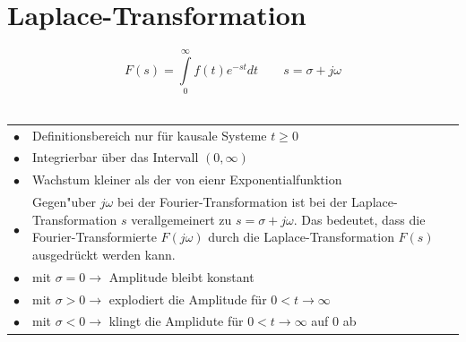 \section{Laplace-Transformation}
	$$\boxed{F(s)=\int\limits_0^\infty f(t)e^{-st}dt} \qquad s=\sigma+j\omega$$\\
	\begin{tabular}{p{1cm}p{17cm}}
		$\bullet$ & Definitionsbereich nur für kausale Systeme $t\geq 0$\\
		$\bullet$ & Integrierbar über das Intervall $(0,\infty)$\\
		$\bullet$ & Wachstum kleiner als der von eienr Exponentialfunktion\\ 
		$\bullet$ & Gegen"uber $j\omega$ bei der Fourier-Transformation ist bei der
			Laplace-Transformation $s$ verallgemeinert zu $s=\sigma + j\omega$. Das
			bedeutet, dass die Fourier-Transformierte $F(j\omega)$ durch die
			Laplace-Transformation $F(s)$ ausgedr\"uckt werden kann. \\
		$\bullet$ & mit $\sigma = 0 \rightarrow$ Amplitude bleibt konstant\\
		$\bullet$ & mit $\sigma > 0 \rightarrow$ explodiert die Amplitude f\"ur $0 < t \rightarrow \infty$ \\
		$\bullet$ & mit $\sigma < 0 \rightarrow$ klingt die Amplidute für $0 < t \rightarrow \infty$ auf $0$ ab
	\end{tabular}
	
